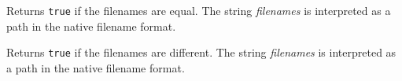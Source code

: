 
Returns {\tt true} if the filenames are equal. The string {\it filenames} is
interpreted as a path in the native filename format.


\label{wxfilenameoperatornotequal}



Returns {\tt true} if the filenames are different. The string {\it filenames}
is interpreted as a path in the native filename format.

